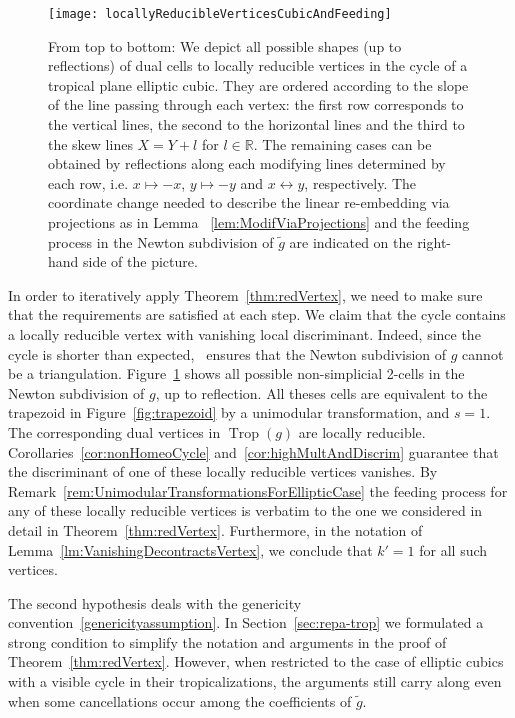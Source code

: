 \documentclass[11pt]{amsart}
\numberwithin{equation}{section}
\theoremstyle{plain}
\theoremstyle{definition}
\theoremstyle{remark}
\begin{document}
\begin{figure}[tb]
\texttt{[image: locallyReducibleVerticesCubicAndFeeding]}
\caption{From top to bottom: We depict all possible shapes (up to
  reflections) of dual cells to locally reducible vertices in the
  cycle of a tropical plane elliptic cubic. They are ordered according
  to the slope of the line passing through each vertex: the first row
  corresponds to the vertical lines, the second to the horizontal
  lines and the third to the skew lines $X=Y+l$ for $l\in {\mathbb{R}}$. The
  remaining cases can be obtained by reflections along each modifying
  lines determined by each row, i.e. $x\mapsto -x$, $y\mapsto -y$ and
  $x\leftrightarrow y$, respectively.  The coordinate change needed to
  describe the linear re-embedding via projections as in Lemma
  ~\ref{lem:ModifViaProjections} and the feeding process in the
  Newton subdivision of $\tilde{g}$ are indicated on the right-hand
  side of the picture.}\label{fig:shapesandfeeding}
\end{figure}

In order to iteratively apply Theorem~\ref{thm:redVertex}, we need to
make sure that the requirements are satisfied at each step. We claim
that the cycle contains a locally reducible vertex with vanishing
local discriminant.  Indeed, since the cycle is shorter than
expected,~\cite[Theorem 11]{KMM07} ensures that the Newton subdivision
of $g$ cannot be a triangulation.  Figure~\ref{fig:shapesandfeeding}
shows all possible non-simplicial 2-cells in the Newton subdivision of
$g$, up to reflection.  All theses cells are equivalent to the
trapezoid in Figure~\ref{fig:trapezoid} by a unimodular
transformation, and $s=1$.  The corresponding dual vertices in
$\operatorname{Trop}(g)$ are locally reducible.  Corollaries~\ref{cor:nonHomeoCycle}
and~\ref{cor:highMultAndDiscrim} guarantee that the discriminant of
one of these locally reducible vertices vanishes. By
Remark~\ref{rem:UnimodularTransformationsForEllipticCase} the feeding
process for any of these locally reducible vertices is verbatim to the
one we considered in detail in
Theorem~\ref{thm:redVertex}. Furthermore, in the notation of
Lemma~\ref{lm:VanishingDecontractsVertex}, we conclude that $k'=1$ for
all such vertices.

The second hypothesis deals with the genericity
convention~\ref{genericityassumption}. In Section~\ref{sec:repa-trop}
we formulated a strong condition to simplify the notation and
arguments in the proof of Theorem~\ref{thm:redVertex}. However, when
restricted to the case of elliptic cubics with a visible cycle in
their tropicalizations, the arguments still carry along even when some
cancellations occur among the coefficients of $\tilde{g}$.
\end{document}
